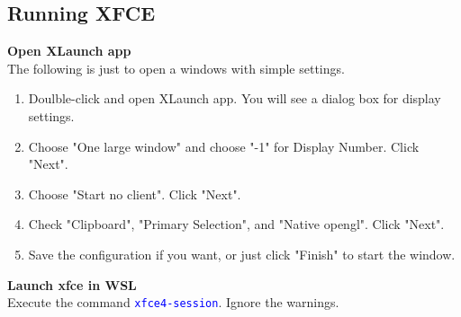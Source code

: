 \subsection{Running XFCE}
\textbf{Open XLaunch app}\\
The following is just to open a windows with simple settings.
\begin{enumerate}
\item Doulble-click and open XLaunch app. You will see a dialog box for display settings.
\item Choose "One large window" and choose "-1" for Display Number. Click "Next".
\item Choose "Start no client". Click "Next".
\item Check "Clipboard", "Primary Selection", and "Native opengl". Click "Next".
\item Save the configuration if you want, or just click "Finish" to start the window.
\end{enumerate}

\textbf{Launch xfce in WSL}\\
Execute the command \textcolor{blue}{\texttt{xfce4-session}}. Ignore the warnings.

\vfill \null
\columnbreak

